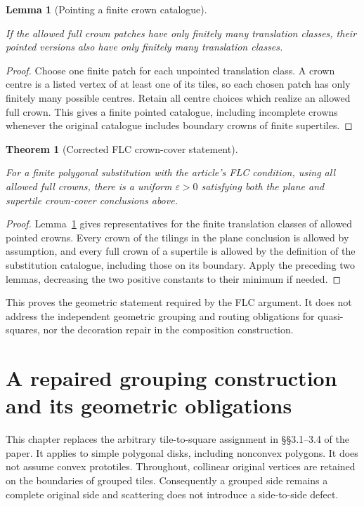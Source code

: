 \documentclass[11pt,a4paper]{article}
\newtheorem{lemma}[definition]{Lemma}
\newtheorem{theorem}[definition]{Theorem}
\theoremstyle{remark}
\newcommand{\lean}[1]{}
\newcommand{\uses}[1]{}
\begin{document}
\begin{lemma}[Pointing a finite crown catalogue]
\label{lem:pointed-flc}
\lean{Tilings.Crowns.pointedFLCOfFLC}
\uses{def:crown,def:flc,lem:localfinite}
If the allowed full crown patches have only finitely many translation
classes, their pointed versions also have only finitely many translation
classes.
\end{lemma}
\begin{proof}
Choose one finite patch for each unpointed translation class.  A crown
centre is a listed vertex of at least one of its tiles, so each chosen
patch has only finitely many possible centres.  Retain all centre choices
which realize an allowed full crown.  This gives a finite pointed
catalogue, including incomplete crowns whenever the original catalogue
includes boundary crowns of finite supertiles.
\end{proof}

\begin{theorem}[Corrected FLC crown-cover statement]
\label{thm:corrected-crown-cover}
\lean{Tilings.Crowns.flcUniformCrownCover}
\uses{def:substitution,def:flc,lem:pointed-flc,lem:crown-cover-plane,lem:crown-cover-supertile}
For a finite polygonal substitution with the article's FLC condition,
using all allowed full crowns, there is a uniform $\varepsilon>0$ satisfying both
the plane and supertile crown-cover conclusions above.
\end{theorem}
\begin{proof}
Lemma~\ref{lem:pointed-flc} gives representatives for the finite translation
classes of allowed pointed crowns.  Every crown of the tilings in the plane conclusion is
allowed by assumption, and every full crown of a supertile is allowed
by the definition of the substitution catalogue, including those on its
boundary.  Apply the preceding two lemmas, decreasing the two positive
constants to their minimum if needed.
\end{proof}

This proves the geometric statement required by the FLC argument.  It
does not address the independent geometric grouping and routing
obligations for quasi-squares, nor the decoration repair in the
composition construction.

\section{A repaired grouping construction and its geometric obligations}

This chapter replaces the arbitrary tile-to-square assignment in
\S\S3.1--3.4 of the paper.  It applies to simple polygonal disks, including
nonconvex polygons.  It does not assume convex prototiles.  Throughout,
collinear original vertices are retained on the boundaries of grouped tiles.
Consequently a grouped side remains a complete original side and scattering
does not introduce a side-to-side defect.
\end{document}
